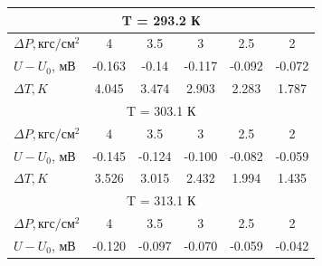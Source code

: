 \documentclass[a4paper, 12pt]{article}%
\begin{document}
	\begin{table}[H]
		\centering
		\begin{tabular}{|lccccc|}
			\hline
			\multicolumn{6}{|c|}{T   = 293.2 К}                                                                                                                                                 \\ \hline
			\multicolumn{1}{|l|}{$\Delta P, кгс/см^2$}       & \multicolumn{1}{c|}{4}      & \multicolumn{1}{c|}{3.5}    & \multicolumn{1}{c|}{3}      & \multicolumn{1}{c|}{2.5}    & 2                           \\ \hline
			\multicolumn{1}{|l|}{$U-U_0$, мВ}       & \multicolumn{1}{c|}{-0.163} & \multicolumn{1}{c|}{-0.14}  & \multicolumn{1}{c|}{-0.117} & \multicolumn{1}{c|}{-0.092} & -0.072                      \\ \hline
			\multicolumn{1}{|l|}{$\Delta T, K$} & \multicolumn{1}{c|}{4.045}  & \multicolumn{1}{c|}{3.474}  & \multicolumn{1}{c|}{2.903}  & \multicolumn{1}{c|}{2.283}  & 1.787                       \\ \hline
			\multicolumn{6}{|c|}{T = 303.1 К}                                                                                                                                                   \\ \hline
			\multicolumn{1}{|l|}{$\Delta P, кгс/см^2$}       & \multicolumn{1}{c|}{4}      & \multicolumn{1}{c|}{3.5}    & \multicolumn{1}{c|}{3}      & \multicolumn{1}{c|}{2.5}    & 2                           \\ \hline
			\multicolumn{1}{|l|}{$U-U_0$, мВ}       & \multicolumn{1}{c|}{-0.145} & \multicolumn{1}{c|}{-0.124} & \multicolumn{1}{c|}{-0.100} & \multicolumn{1}{c|}{-0.082} & -0.059                      \\ \hline
			\multicolumn{1}{|l|}{$\Delta T, K$} & \multicolumn{1}{c|}{3.526}  & \multicolumn{1}{c|}{3.015}  & \multicolumn{1}{c|}{2.432}  & \multicolumn{1}{c|}{1.994}  & 1.435                       \\ \hline
			\multicolumn{6}{|c|}{T = 313.1 К}                                                                                                                                                   \\ \hline
			\multicolumn{1}{|l|}{$\Delta P, кгс/см^2$}       & \multicolumn{1}{c|}{4}      & \multicolumn{1}{c|}{3.5}    & \multicolumn{1}{c|}{3}      & \multicolumn{1}{c|}{2.5}    & 2                           \\ \hline
			\multicolumn{1}{|l|}{$U-U_0$, мВ}       & \multicolumn{1}{c|}{-0.120} & \multicolumn{1}{c|}{-0.097} & \multicolumn{1}{c|}{-0.070} & \multicolumn{1}{c|}{-0.059} & -0.042                      \\ \hline

\end{tabular}
\end{table}
\end{document}
